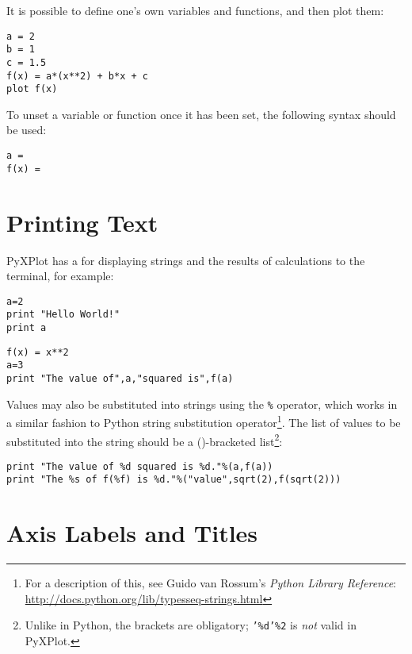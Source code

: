 \noindent It is possible to define one's own variables and functions, and then
plot them:

\begin{verbatim}
a = 2
b = 1
c = 1.5
f(x) = a*(x**2) + b*x + c
plot f(x)
\end{verbatim}

\noindent To unset a variable or function once it has been set, the following
syntax should be
used:

\begin{verbatim}
a =
f(x) =
\end{verbatim}

\section{Printing Text}
\label{string_subs_op}

PyXPlot has a  for displaying strings and the results of
calculations to the terminal, for example:

\begin{verbatim}
a=2
print "Hello World!"
print a
\end{verbatim}

\begin{verbatim}
f(x) = x**2
a=3
print "The value of",a,"squared is",f(a)
\end{verbatim}

\noindent Values may also be substituted into strings using the {\tt \%}
operator, which works in a similar fashion
to Python string substitution operator\footnote{For a description of this, see Guido van
Rossum's {\it Python Library Reference}: \url{http://docs.python.org/lib/typesseq-strings.html}}.
The list of values to be substituted into the string should be a ()-bracketed
list\footnote{Unlike in Python, the brackets are obligatory; {\tt '\%d'\%2} is
{\it not} valid in PyXPlot.}:

\begin{verbatim}
print "The value of %d squared is %d."%(a,f(a))
print "The %s of f(%f) is %d."%("value",sqrt(2),f(sqrt(2)))
\end{verbatim}

\section{Axis Labels and Titles}
\label{sec:latex_incompatibility}

